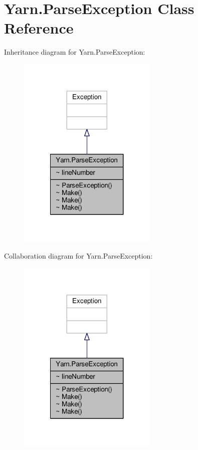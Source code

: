 \hypertarget{a00137}{\section{Yarn.\-Parse\-Exception Class Reference}
\label{a00137}
}


Inheritance diagram for Yarn.\-Parse\-Exception\-:
\nopagebreak
\begin{figure}[H]
\begin{center}
\leavevmode
\includegraphics[width=188pt]{a00694}
\end{center}
\end{figure}


Collaboration diagram for Yarn.\-Parse\-Exception\-:
\nopagebreak
\begin{figure}[H]
\begin{center}
\leavevmode
\includegraphics[width=188pt]{a00695}
\end{center}
\end{figure}
